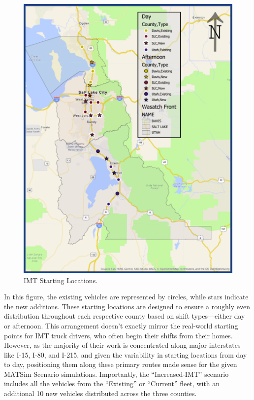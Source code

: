 \documentclass[
  letterpaper,
  authoryear]{elsarticle}
\begin{document}
\begin{figure}

{\centering \includegraphics{figures/fig6.png}

}

\caption{\label{fig-IMT_Map}IMT Starting Locations.}

\end{figure}

In this figure, the existing vehicles are represented by circles, while
stars indicate the new additions. These starting locations are designed
to ensure a roughly even distribution throughout each respective county
based on shift types---either day or afternoon. This arrangement doesn't
exactly mirror the real-world starting points for IMT truck drivers, who
often begin their shifts from their homes. However, as the majority of
their work is concentrated along major interstates like I-15, I-80, and
I-215, and given the variability in starting locations from day to day,
positioning them along these primary routes made sense for the given
MATSim Scenario simulations. Importantly, the ``Increased-IMT'' scenario
includes all the vehicles from the ``Existing'' or ``Current'' fleet,
with an additional 10 new vehicles distributed across the three
counties.
\end{document}
